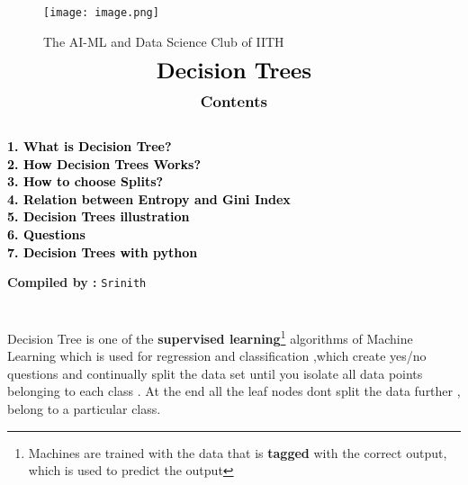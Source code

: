 \documentclass[12pt,a4paper]{article}
\begin{document}
\begin{center}
\begin{figure}[h]
\centering
\texttt{[image: image.png]}
\caption{{{\selectfont The AI-ML and Data Science Club of IITH}}}
\end{figure}
\end{center}
\begin{align*}
{\LARGE{\textbf{Decision Trees}}}
\end{align*}
\graphicspath{{./media/}}
\begin{align*}
\large{\textbf{{Contents}}}
\end{align*}
{\textcolor{black}{\textbf{
 \\
 1. {What is Decision Tree?}\\
 2. {How Decision Trees Works?}\\
 3. {How to choose Splits?}\\
 4. {Relation between Entropy and Gini Index}\\
 5. {Decision Trees illustration}\\
 6. {Questions}\\
7. {Decision Trees with python}\\
}}}
\begin{center}
    {\textbf{Compiled by :}
    \texttt{Srinith}}
\end{center}

\newpage
\section{}
Decision Tree is one of the \textbf{supervised learning}\footnote{Machines are trained with the data that is \textbf{tagged} with the correct output, which is used to predict the output} algorithms of Machine Learning which is used for  regression and classification ,which create yes/no questions and continually split the data set until you isolate all data points belonging to each class . At the end all the leaf nodes dont split the data further , belong to a particular class.
\end{document}
